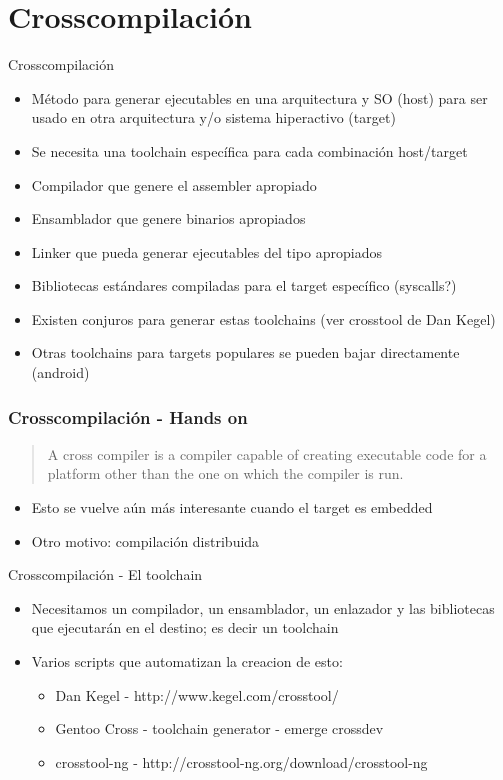 \documentclass[xetex]{beamer}
\begin{document}
\section{Crosscompilación}
\begin{frame}{Crosscompilación}
\begin{itemize}
  \item Método para generar ejecutables en una arquitectura y SO (host) para
    ser usado en otra arquitectura y/o sistema hiperactivo (target)
  \item Se necesita una toolchain específica para cada combinación host/target
  \item Compilador que genere el assembler apropiado
  \item Ensamblador que genere binarios apropiados
  \item Linker que pueda generar ejecutables del tipo apropiados
  \item Bibliotecas estándares compiladas para el target específico (syscalls?)
  \item Existen conjuros para generar estas toolchains (ver crosstool de Dan Kegel)
  \item Otras toolchains para targets populares se pueden bajar directamente (android)
\end{itemize}
\end{frame}

\begin{frame}
 \frametitle{Crosscompilación - Hands on}
\begin{quotation}
A cross compiler is a compiler capable of creating
executable code for a platform other than the one
on which the compiler is run.
\end{quotation}

\begin{itemize}
  \item Esto se vuelve aún más interesante cuando el target es embedded
  \item Otro motivo: compilación distribuida
\end{itemize}
\end{frame}

\begin{frame}{Crosscompilación - El toolchain}

\begin{itemize}
\item Necesitamos un compilador, un ensamblador, un enlazador y las bibliotecas que ejecutarán en el destino; es decir un toolchain
\item Varios scripts que automatizan la creacion de esto:
\begin{itemize}
  \item Dan Kegel - http://www.kegel.com/crosstool/
  \item Gentoo Cross - toolchain generator - emerge crossdev
  \item crosstool-ng - http://crosstool-ng.org/download/crosstool-ng
\end{itemize}
\end{itemize}
\end{frame}
\end{document}
